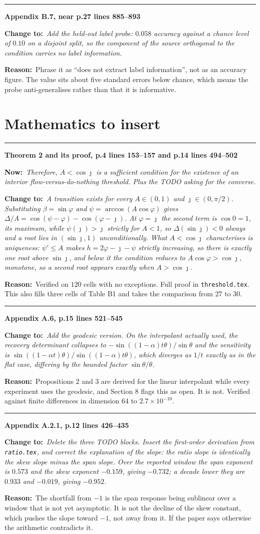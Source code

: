 \documentclass[11pt]{article}
\newcommand{\NEW}[1]{\medskip\noindent\textcolor{hd}{\rule{\textwidth}{0.6pt}}\par
  \noindent\textbf{#1}\par\smallskip}
\newcommand{\OLD}[1]{\noindent\textcolor{cut}{\textbf{Now:}}\ \begingroup\itshape #1\endgroup\par\smallskip}
\newcommand{\FIX}[1]{\noindent\textcolor{put}{\textbf{Change to:}}\ \begingroup\itshape #1\endgroup\par\smallskip}
\newcommand{\NOTE}[1]{\noindent\textbf{Reason:}\ #1\par}
\begin{document}
\NEW{Appendix B.7, near p.27 lines 885--893}
\FIX{Add the held-out label probe: $0.058$ accuracy against a chance level of $0.10$ on a
disjoint split, so the component of the source orthogonal to the condition carries no label
information.}
\NOTE{Phrase it as ``does not extract label information'', not as an accuracy figure. The value
sits about five standard errors below chance, which means the probe anti-generalises rather than
that it is informative.}

\section{Mathematics to insert}

\NEW{Theorem 2 and its proof, p.4 lines 153--157 and p.14 lines 494--502}
\OLD{Therefore, $A<\cos\jmath$ is a sufficient condition for the existence of an interior
flow-versus-do-nothing threshold. \emph{Plus the TODO asking for the converse.}}
\FIX{A transition exists for every $A\in(0,1)$ and $\jmath\in(0,\pi/2)$. Substituting
$\beta=\sin\varphi$ and $\psi=\arccos(A\cos\varphi)$ gives
$\Delta/A=\cos(\psi-\varphi)-\cos(\varphi-\jmath)$. At $\varphi=\jmath$ the second term is
$\cos 0=1$, its maximum, while $\psi(\jmath)>\jmath$ strictly for $A<1$, so
$\Delta(\sin\jmath)<0$ always and a root lies in $(\sin\jmath,1)$ unconditionally. What
$A<\cos\jmath$ characterises is uniqueness: $\psi'\le A$ makes $h=2\varphi-\jmath-\psi$ strictly
increasing, so there is exactly one root above $\sin\jmath$, and below it the condition reduces
to $A\cos\varphi>\cos\jmath$, monotone, so a second root appears exactly when $A>\cos\jmath$.}
\NOTE{Verified on $120$ cells with no exceptions. Full proof in \texttt{threshold.tex}. This also
fills three cells of Table B1 and takes the comparison from $27$ to $30$.}

\NEW{Appendix A.6, p.15 lines 521--545}
\FIX{Add the geodesic version. On the interpolant actually used, the recovery determinant
collapses to $-\sin((1-\alpha)t\theta)/\sin\theta$ and the sensitivity is
$\sin((1-\alpha t)\theta)/\sin((1-\alpha)t\theta)$, which diverges as $1/t$ exactly as in the
flat case, differing by the bounded factor $\sin\theta/\theta$.}
\NOTE{Propositions 2 and 3 are derived for the linear interpolant while every experiment uses the
geodesic, and Section 8 flags this as open. It is not. Verified against finite differences in
dimension $64$ to $2.7\times10^{-10}$.}

\NEW{Appendix A.2.1, p.12 lines 426--435}
\FIX{Delete the three TODO blocks. Insert the first-order derivation from \texttt{ratio.tex}, and
correct the explanation of the slope: the ratio slope is identically the skew slope minus the
span slope. Over the reported window the span exponent is $0.573$ and the skew exponent $-0.159$,
giving $-0.732$; a decade lower they are $0.933$ and $-0.019$, giving $-0.952$.}
\NOTE{The shortfall from $-1$ is the span response being sublinear over a window that is not yet
asymptotic. It is not the decline of the skew constant, which pushes the slope toward $-1$, not
away from it. If the paper says otherwise the arithmetic contradicts it.}
\end{document}
